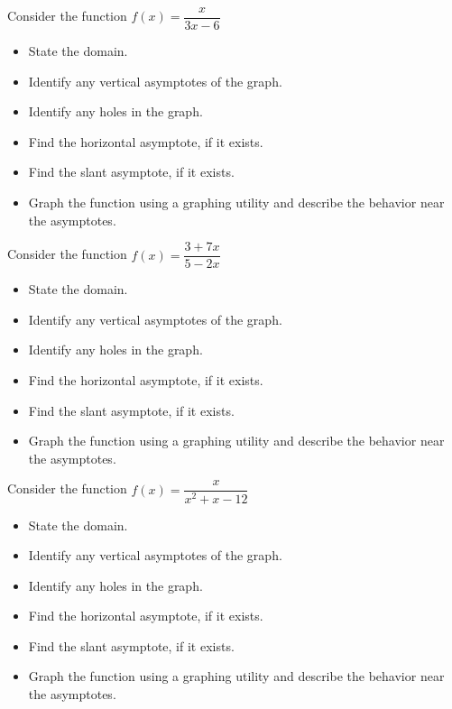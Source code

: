 \documentclass{ximera}
\begin{document}
\begin{problem}\label{alltheasympfirst}
Consider the function $f(x) = \dfrac{x}{3x - 6}$
\begin{itemize}
\item State the domain.
\item Identify any vertical asymptotes of the graph.
\item Identify any holes in the graph.
\item Find the horizontal asymptote, if it exists.
\item Find the slant asymptote, if it exists.
\item Graph the function using a graphing utility and describe the behavior near the asymptotes.
\end{itemize}
\end{problem}

\begin{problem}
Consider the function $f(x) = \dfrac{3 + 7x}{5 - 2x}$
\begin{itemize}
\item State the domain.
\item Identify any vertical asymptotes of the graph.
\item Identify any holes in the graph.
\item Find the horizontal asymptote, if it exists.
\item Find the slant asymptote, if it exists.
\item Graph the function using a graphing utility and describe the behavior near the asymptotes.
\end{itemize}
\end{problem} 

\begin{problem}
Consider the function $f(x) = \dfrac{x}{x^{2} + x - 12}$
\begin{itemize}
\item State the domain.
\item Identify any vertical asymptotes of the graph.
\item Identify any holes in the graph.
\item Find the horizontal asymptote, if it exists.
\item Find the slant asymptote, if it exists.
\item Graph the function using a graphing utility and describe the behavior near the asymptotes.
\end{itemize}
\end{problem} 
\end{document}
